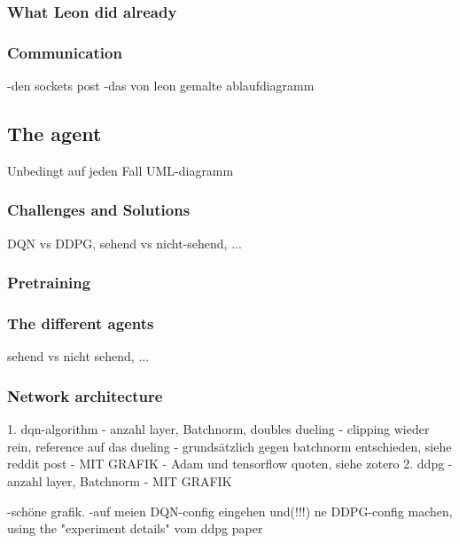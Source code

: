 \subsubsection{What Leon did already}

\subsubsection{Communication}

-den sockets post
-das von leon gemalte ablaufdiagramm

\subsection{The agent}

Unbedingt auf jeden Fall UML-diagramm

\subsubsection{Challenges and Solutions}

DQN vs DDPG, sehend vs nicht-sehend, ...

\subsubsection{Pretraining}

\subsubsection{The different agents}

sehend vs nicht sehend, ...

\subsubsection{Network architecture}

1. dqn-algorithm
- anzahl layer, Batchnorm, doubles dueling
- clipping wieder rein, reference auf das dueling
- grundsätzlich gegen batchnorm entschieden, siehe reddit post
- MIT GRAFIK
- Adam und tensorflow quoten, siehe zotero
2. ddpg
- anzahl layer, Batchnorm
- MIT GRAFIK

-schöne grafik.
-auf meien DQN-config eingehen und(!!!) ne DDPG-config machen, using the "experiment details" vom ddpg paper  


